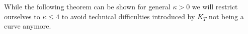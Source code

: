 \documentclass[11pt,reqno]{amsart}
\numberwithin{equation}{section}
\newtheorem{thm}{Theorem}[section]
\newtheorem{rem}[thm]{Remark}
\newcommand{\eps}{\varepsilon}
\begin{document}


	
	


While the following theorem can be shown for general $\kappa>0$ we will restrict ourselves to $\kappa\leq 4$ to avoid technical difficulties introduced by $K_T$ not being a curve anymore.
\end{document}
